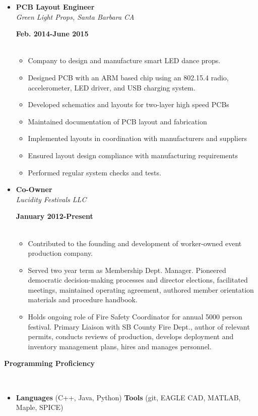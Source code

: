 \documentclass[a4paper,11pt]{article}
\newcommand{\isep}{-2 pt}
\newcommand{\lsep}{-0.2cm}
\newcommand{\resheading}[1]{{\small \colorbox{mygrey}{\begin{minipage}{0.975\textwidth}{\textbf{#1 \vphantom{p\^{E}}}}\end{minipage}}}}
\newcommand{\workexp}[4]{
\begin{minipage}[t]{7cm}
\begin{flushleft}
\textbf{#1} \\
\indent \emph{#2}\\
\end{flushleft}
\end{minipage}
\hfill
\begin{minipage}[t]{7cm}
\begin{flushright}
\textbf{#3} \\
\indent #4 \\
\end{flushright}
\end{minipage}
}
\begin{document}
\begin{itemize}
\item
\workexp{PCB Layout Engineer}{Green Light Props, Santa Barbara CA}{Feb. 2014-June 2015}{}
	\begin{itemize}\itemsep \isep
	\item Company to design and manufacture smart LED dance props.
	\item Designed PCB with an ARM based chip using an 802.15.4 radio, accelerometer, LED driver, and USB charging system.
	\item Developed schematics and layouts for two-layer high speed PCBs
	\item Maintained documentation of PCB layout and fabrication
	\item Implemented layouts in coordination with manufacturers and suppliers
	\item Ensured layout design compliance with manufacturing requirements
	\item Performed regular system checks and tests.
	\end{itemize}
\item
\workexp{Co-Owner}{Lucidity Festivals LLC}{January 2012-Present}{}
	\begin{itemize}\itemsep \isep
	\item Contributed to the founding and development of worker-owned event production company.
	\item Served two year term as Membership Dept. Manager. Pioneered democratic decision-making processes and director elections, facilitated meetings, maintained operating agreement, authored member orientation materials and procedure handbook.
	\item Holds ongoing role of Fire Safety Coordinator for annual 5000 person festival. Primary Liaison with SB County Fire Dept., author of relevant permits, conducts reviews of production, develops deployment and inventory management plans, hires and manages personnel.
	\end{itemize}
\end{itemize}


\resheading{\textbf{Programming Proficiency} }\\[\lsep]
\begin{itemize}
\item \noindent \textbf{Languages} (C++, Java, Python)  
\textbf{Tools} (git, EAGLE CAD, MATLAB, Maple, SPICE) 
\end{itemize} 
\end{document}

